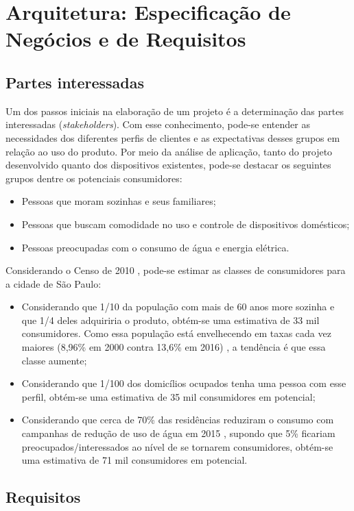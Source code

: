 \chapter{Arquitetura: Especificação de Negócios e de Requisitos}

\section{Partes interessadas}
Um dos passos iniciais na elaboração de um projeto é a determinação das partes interessadas (\emph{stakeholders}). Com esse conhecimento, pode-se entender as necessidades dos diferentes perfis de clientes e as expectativas desses grupos em relação ao uso do produto. Por meio da análise de aplicação, tanto do projeto desenvolvido quanto dos dispositivos existentes, pode-se destacar os seguintes grupos dentre os potenciais consumidores:

\begin{itemize}
\item Pessoas que moram sozinhas e seus familiares;
\item Pessoas que buscam comodidade no uso e controle de dispositivos domésticos;
\item Pessoas preocupadas com o consumo de água e energia elétrica.
\end{itemize}

Considerando o Censo de 2010 \cite{ibge}, pode-se estimar as classes de consumidores para a cidade de São Paulo:

\begin{itemize}
\item Considerando que 1/10 da população com mais de 60 anos more sozinha e que 1/4 deles adquiriria o produto, obtém-se uma estimativa de 33 mil consumidores. Como essa população está envelhecendo em taxas cada vez maiores (8,96\% em 2000 contra 13,6\% em 2016) \cite{bibliotecaVirtual}, a tendência é que essa classe aumente;
\item Considerando que 1/100 dos domicílios ocupados tenha uma pessoa com esse perfil, obtém-se uma estimativa de 35 mil consumidores em potencial;
\item Considerando que cerca de 70\% das residências reduziram o consumo com campanhas de redução de uso de água em 2015 \cite{g1}, supondo que 5\% ficariam preocupados/interessados ao nível de se tornarem consumidores, obtém-se uma estimativa de 71 mil consumidores em potencial.
\end{itemize}

\section{Requisitos \label{sec:requisitos}}

